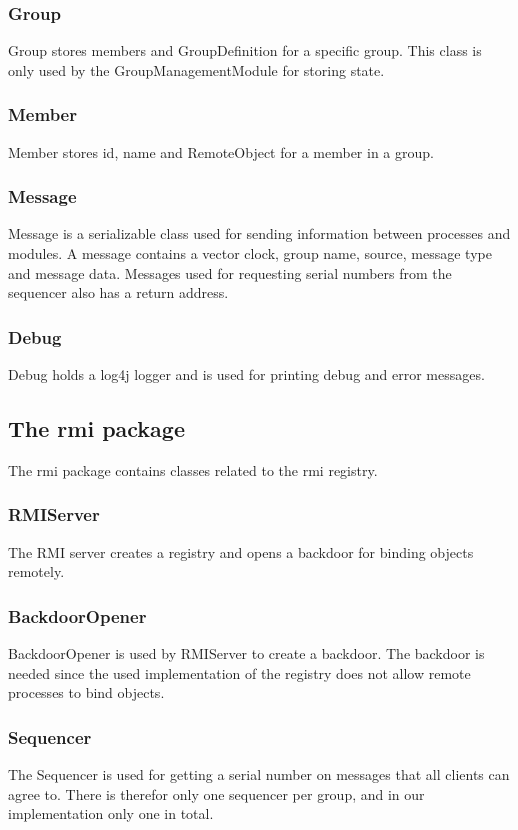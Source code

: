 \documentclass[english]{article}
\begin{document}
\subsubsection{Group}
Group stores members and GroupDefinition for a specific group. This class is only used by the GroupManagementModule for storing state.

\subsubsection{Member}
Member stores id, name and RemoteObject for a member in a group.

\subsubsection{Message}
Message is a serializable class used for sending information between processes and modules. A message contains a vector clock, group name, source, message type and message data. Messages used for requesting serial numbers from the sequencer also has a return address.

\subsubsection{Debug}
Debug holds a log4j logger and is used for printing debug and error messages.

\subsection{The rmi package}
The rmi package contains classes related to the rmi registry. 

\subsubsection{RMIServer}
The RMI server creates a registry and opens a backdoor for binding objects remotely.

\subsubsection{BackdoorOpener}
BackdoorOpener is used by RMIServer to create a backdoor. The backdoor is needed since the used implementation of the registry does not allow remote processes to bind objects.

\subsubsection{Sequencer}
The Sequencer is used for getting a serial number on messages that all clients can agree to. There is therefor only one sequencer per group, and in our implementation only one in total.
\end{document}

